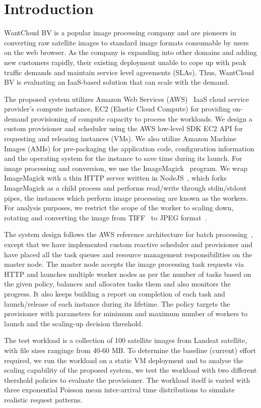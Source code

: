 \documentclass[a4paper]{IEEEtran}
\begin{document}
\section{Introduction}

WantCloud BV is a popular image processing company and are pioneers in converting raw satellite images to standard image formats consumable by users on the web browser. As the company is expanding into other domains and 
adding new customers rapidly, their existing deployment unable to cope up with peak traffic demands and
 maintain service level agreements (SLAs). Thus, WantCloud BV is evaluating an IaaS-based solution that
 can scale with the demand.

The proposed system utilizes Amazon Web Services (AWS)~\cite{aws} IaaS cloud service provider's compute instance, EC2 (Elastic Cloud Compute) for providing on-demand provisioning of compute capacity to process the workloads.
We design a custom provisioner and scheduler using the AWS low-level SDK EC2 API for requesting and releasing instances (VMs).
We also utilize Amazon Machine Images (AMIs) for pre-packaging the application code,
configuration information and the operating system for the instance to save time during its launch. For image processing and conversion, we use the ImageMagick~\cite{imagemagick} program. We wrap ImageMagick with a thin HTTP server written in NodeJS~\cite{nodejs}, which forks ImageMagick as a child process and performs read/write through stdin/stdout pipes, the instances which perform image processing are known as
the workers. For analysis purposes, we restrict the scope of the worker to scaling down, rotating and converting the
image from TIFF~\cite{rfc3302} to JPEG format~\cite{jpeg}.

The system design follows the AWS reference architecture for batch processing~\cite{aws_batch}, except that we have
implemented custom reactive scheduler and provisioner and have placed all the task queues and resource management responsibilities on the master node. The master node accepts the image processing task requests via HTTP and launches multiple worker nodes as per the number of tasks based on the given policy, balances and allocates tasks them and also monitors the progress. It also keeps building a report on completion of each task and launch/release of each instance during its lifetime. The policy targets the provisioner with parameters for minimum and maximum
number of workers to launch and the scaling-up decision threshold.

The test workload is a collection of 100 satellite images from Landsat satellite, with file sizes ranginge from 40-60 MB. To determine the baseline (current) effort required, we run the workload on a static VM deployment and to analyse the scaling capability of the proposed system, we test the workload with two different thershold policies to evaluate the provisioner. The workload itself is varied with three exponential Poisson mean inter-arrival time distributions to simulate realistic request patterns.
\end{document}
